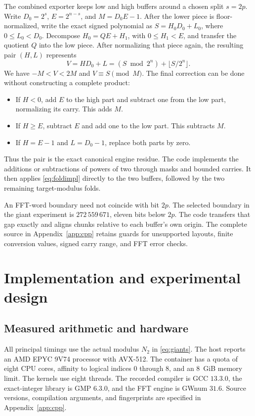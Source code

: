 \documentclass[11pt,a4paper]{article}
\theoremstyle{definition}
\begin{document}
The combined exporter keeps low and high buffers around a chosen split
$s=2p$. Write $D_0=2^s$, $E=2^{n-s}$, and $M=D_0E-1$. After the lower
piece is floor-normalized, write the exact signed polynomial as
$S=H_0D_0+L_0$, where $0\le L_0<D_0$. Decompose $H_0=QE+H_1$, with
$0\le H_1<E$, and transfer the quotient $Q$ into the low piece. After
normalizing that piece again, the resulting pair $(H,L)$ represents
\[
 V=HD_0+L=(S\bmod2^n)+\lfloor S/2^n\rfloor.
\]
We have $-M<V<2M$ and $V\equiv S\pmod M$. The final correction can be
done without constructing a complete product:
\begin{itemize}
\item If $H<0$, add $E$ to the high part and subtract one from the low
part, normalizing its carry. This adds $M$.
\item If $H\ge E$, subtract $E$ and add one to the low part. This
subtracts $M$.
\item If $H=E-1$ and $L=D_0-1$, replace both parts by zero.
\end{itemize}
Thus the pair is the exact canonical engine residue. The code implements
the additions or subtractions of powers of two through masks and bounded
carries. It then applies \eqref{eq:foldimpl} directly to the two buffers,
followed by the two remaining target-modulus folds.

An FFT-word boundary need not coincide with bit $2p$. The selected boundary
in the giant experiment is $272\,559\,671$, eleven bits below $2p$.
The code transfers that gap exactly and aligns chunks relative to each
buffer's own origin. The complete source in Appendix~\ref{app:cpp} retains
guards for unsupported layouts, finite conversion values, signed carry
range, and FFT error checks.
\section{Implementation and experimental design}
\label{sec:experiments}

\subsection{Measured arithmetic and hardware}

All principal timings use the actual modulus $N_2$ in \eqref{eq:giants}.
The host reports an AMD EPYC 9V74 processor with AVX-512. The container
has a quota of eight CPU cores, affinity to logical indices $0$ through
$8$, and an $8$~GiB memory limit. The kernels use eight threads. The
recorded compiler is GCC $13.3.0$, the exact-integer library is GMP
$6.3.0$, and the FFT engine is GWnum $31.6$. Source versions, compilation
arguments, and fingerprints are specified in Appendix~\ref{app:cpp}.
\end{document}
